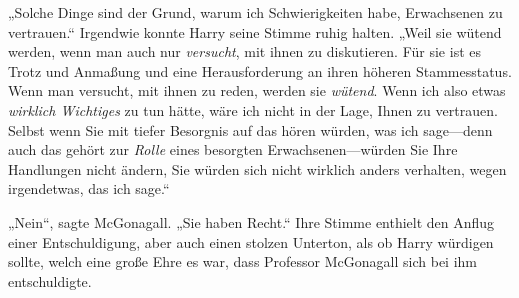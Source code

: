 „Solche Dinge sind der Grund, warum ich Schwierigkeiten habe, Erwachsenen zu vertrauen.“ Irgendwie konnte Harry seine Stimme ruhig halten. „Weil sie wütend werden, wenn man auch nur \emph{versucht}, mit ihnen zu diskutieren. Für sie ist es Trotz und Anmaßung und eine Herausforderung an ihren höheren Stammesstatus. Wenn man versucht, mit ihnen zu reden, werden sie \emph{wütend}. Wenn ich also etwas \emph{wirklich Wichtiges} zu tun hätte, wäre ich nicht in der Lage, Ihnen zu vertrauen. Selbst wenn Sie mit tiefer Besorgnis auf das hören würden, was ich sage—denn auch das gehört zur \emph{Rolle} eines besorgten Erwachsenen—würden Sie Ihre Handlungen nicht ändern, Sie würden sich nicht wirklich anders verhalten, wegen irgendetwas, das ich sage.“

„Nein“, sagte McGonagall. „Sie haben Recht.“ Ihre Stimme enthielt den Anflug einer Entschuldigung, aber auch einen stolzen Unterton, als ob Harry würdigen sollte, welch eine große Ehre es war, dass Professor McGonagall sich bei ihm entschuldigte.



